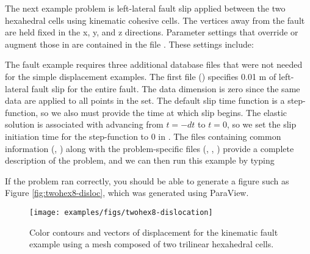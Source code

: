 The next example problem is left-lateral fault slip applied between
the two hexahedral cells using kinematic cohesive cells. The vertices
away from the fault are held fixed in the x, y, and z directions.
Parameter settings that override or augment those in 
are contained in the file . These settings
include:
\begin{inventory}
\end{inventory}
The fault example requires three additional database files that were
not needed for the simple displacement examples. The first file
() specifies 0.01 m of
left-lateral fault slip for the entire fault.  The data dimension is
zero since the same data are applied to all points in the set. The
default slip time function is a step-function, so we also must provide
the time at which slip begins. The elastic solution is associated with
advancing from $t=-dt$ to $t=0$, so we set the slip initiation time
for the step-function to 0 in
.  The files containing
common information (, )
along with the problem-specific files (,
,
) provide a complete
description of the problem, and we can then run this example by typing
If the problem ran correctly, you should be able to generate a figure
such as Figure \vref{fig:twohex8-disloc}, which was generated using
ParaView.

\begin{figure}
  \texttt{[image: examples/figs/twohex8-dislocation]}
  \caption{Color contours and vectors of displacement for the kinematic fault
    example using a mesh composed of two trilinear hexahedral cells.}
  \label{fig:twohex8-disloc}
\end{figure}


